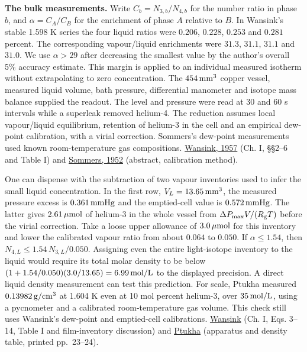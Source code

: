 \documentclass[11pt,a4paper]{article}
\begin{document}
\textbf{The bulk measurements.} Write \(C_b=N_{3,b}/N_{4,b}\) for the
number ratio in phase \(b\), and \(\alpha=C_A/C_B\) for the enrichment
of phase \(A\) relative to \(B\). In Wansink's stable 1.598 K series the
four liquid ratios were \(0.206\), \(0.228\), \(0.253\) and \(0.281\)
percent. The corresponding vapour/liquid enrichments were \(31.3\),
\(31.1\), \(31.1\) and \(31.0\). We use \(\alpha>29\) after decreasing
the smallest value by the author's overall 5\% accuracy estimate. This
margin is applied to an individual measured isotherm without
extrapolating to zero concentration. The \(454\,{\rm mm^3}\) copper
vessel, measured liquid volume, bath pressure, differential manometer
and isotope mass balance supplied the readout. The level and pressure
were read at 30 and 60 s intervals while a superleak removed helium-4.
The reduction assumes local vapour/liquid equilibrium, retention of
helium-3 in the cell and an empirical dew-point calibration, with a
virial correction. Sommers's dew-point measurements used known
room-temperature gas compositions.
\href{https://www.lorentz.leidenuniv.nl/history/proefschriften/sources/Wansink_1957.pdf}{Wansink,
1957} (Ch. I, §§2--6 and Table I) and
\href{https://doi.org/10.1103/PhysRev.88.113}{Sommers, 1952} (abstract,
calibration method).

One can dispense with the subtraction of two vapour inventories used to
infer the small liquid concentration. In the first row,
\(V_L=13.65\,{\rm mm^3}\), the measured pressure excess is
\(0.361\,{\rm mmHg}\) and the emptied-cell value is
\(0.572\,{\rm mmHg}\). The latter gives \(2.61\,\mu{\rm mol}\) of
helium-3 in the whole vessel from \(\Delta P_{\max}V/(R_{\rm g}T)\)
before the virial correction. Take a loose upper allowance of
\(3.0\,\mu{\rm mol}\) for this inventory and lower the calibrated vapour
ratio from about \(0.064\) to \(0.050\). If \(\alpha\le1.54\), then
\(N_{4,L}\le1.54\,N_{3,L}/0.050\). Assigning even the entire
light-isotope inventory to the liquid would require its total molar
density to be below \((1+1.54/0.050)(3.0/13.65)=6.99\,{\rm mol/L}\) to
the displayed precision. A direct liquid density measurement can test
this prediction. For scale, Ptukha measured \(0.13982\,{\rm g/cm^3}\) at
1.604 K even at 10 mol percent helium-3, over \(35\,{\rm mol/L}\), using
a pycnometer and a calibrated room-temperature gas volume. This check
still uses Wansink's dew-point and emptied-cell calibrations.
\href{https://www.lorentz.leidenuniv.nl/history/proefschriften/sources/Wansink_1957.pdf}{Wansink}
(Ch. I, Eqs. 3--14, Table I and film-inventory discussion) and
\href{https://jetp.ras.ru/cgi-bin/dn/e_007_01_0022.pdf}{Ptukha}
(apparatus and density table, printed pp.~23--24).
\end{document}
